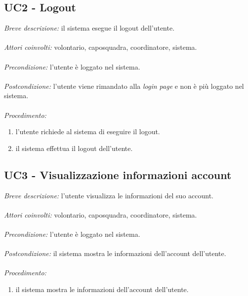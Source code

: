 \subsection{UC2 - Logout}
\textit{Breve descrizione:} il sistema esegue il logout dell'utente.
\\
\\
\textit{Attori coinvolti:} volontario, caposquadra, coordinatore, sistema.
\\
\\
\textit{Precondizione:} l'utente è loggato nel sistema.
\\
\\
\textit{Postcondizione:} l'utente viene rimandato alla \textit{login page} e non è più loggato nel sistema.
\\
\\
\textit{Procedimento:}
\begin{enumerate}
	\item l'utente richiede al sistema di eseguire il logout.
	\item il sistema effettua il logout dell'utente.
\end{enumerate}

\subsection{UC3 - Visualizzazione informazioni account}
\textit{Breve descrizione:} l'utente visualizza le informazioni del suo account.
\\
\\
\textit{Attori coinvolti:} volontario, caposquadra, coordinatore, sistema. 
\\
\\
\textit{Precondizione:} l'utente è loggato nel sistema.
\\
\\
\textit{Postcondizione:} il sistema mostra le informazioni dell'account dell'utente.
\\
\\
\textit{Procedimento:}
\begin{enumerate}
	\item il sistema mostra le informazioni dell'account dell'utente.
\end{enumerate}


